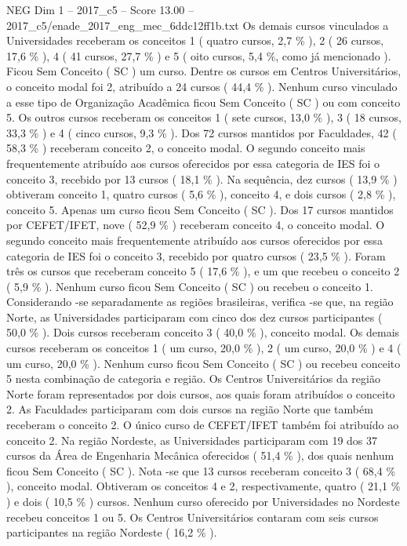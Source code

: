 \begin{textsample}{NEG Dim 1 – 2017\_c5 – Score 13.00 – 2017\_c5/enade\_2017\_eng\_mec\_6ddc12ff1b.txt}
Os demais cursos vinculados a Universidades receberam os conceitos 1 ( quatro cursos, 2,7 \% ), 2 ( 26 cursos, 17,6 \% ), 4 ( 41 cursos, 27,7 \% ) e 5 ( oito cursos, 5,4 \%, como já mencionado ).
Ficou Sem Conceito ( SC ) um curso.
Dentre os cursos em Centros Universitários, o conceito modal foi 2, atribuído a 24 cursos ( 44,4 \% ).
Nenhum curso vinculado a esse tipo de Organização Acadêmica ficou Sem Conceito ( SC ) ou com conceito 5.
Os outros cursos receberam os conceitos 1 ( sete cursos, 13,0 \% ), 3 ( 18 cursos, 33,3 \% ) e 4 ( cinco cursos, 9,3 \% ).
Dos 72 cursos mantidos por Faculdades, 42 ( 58,3 \% ) receberam conceito 2, o conceito modal.
O segundo conceito mais frequentemente atribuído aos cursos oferecidos por essa categoria de IES foi o conceito 3, recebido por 13 cursos ( 18,1 \% ).
Na sequência, dez cursos ( 13,9 \% ) obtiveram conceito 1, quatro cursos ( 5,6 \% ), conceito 4, e dois cursos ( 2,8 \% ), conceito 5.
Apenas um curso ficou Sem Conceito ( SC ).
Dos 17 cursos mantidos por CEFET/IFET, nove ( 52,9 \% ) receberam conceito 4, o conceito modal.
O segundo conceito mais frequentemente atribuído aos cursos oferecidos por essa categoria de IES foi o conceito 3, recebido por quatro cursos ( 23,5 \% ).
Foram três os cursos que receberam conceito 5 ( 17,6 \% ), e um que recebeu o conceito 2 ( 5,9 \% ).
Nenhum curso ficou Sem Conceito ( SC ) ou recebeu o conceito 1.
Considerando -se separadamente as regiões brasileiras, verifica -se que, na região Norte, as Universidades participaram com cinco dos dez cursos participantes ( 50,0 \% ).
Dois cursos receberam conceito 3 ( 40,0 \% ), conceito modal.
Os demais cursos receberam os conceitos 1 ( um curso, 20,0 \% ), 2 ( um curso, 20,0 \% ) e 4 ( um curso, 20,0 \% ).
Nenhum curso ficou Sem Conceito ( SC ) ou recebeu conceito 5 nesta combinação de categoria e região.
Os Centros Universitários da região Norte foram representados por dois cursos, aos quais foram atribuídos o conceito 2.
As Faculdades participaram com dois cursos na região Norte que também receberam o conceito 2.
O único curso de CEFET/IFET também foi atribuído ao conceito 2.
Na região Nordeste, as Universidades participaram com 19 dos 37 cursos da Área de Engenharia Mecânica oferecidos ( 51,4 \% ), dos quais nenhum ficou Sem Conceito ( SC ).
Nota -se que 13 cursos receberam conceito 3 ( 68,4 \% ), conceito modal.
Obtiveram os conceitos 4 e 2, respectivamente, quatro ( 21,1 \% ) e dois ( 10,5 \% ) cursos.
Nenhum curso oferecido por Universidades no Nordeste recebeu conceitos 1 ou 5.
Os Centros Universitários contaram com seis cursos participantes na região Nordeste ( 16,2 \% ).

\end{textsample}
